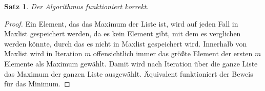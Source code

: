 \documentclass{article}
\newtheorem*{theorem*}{Satz}
\theoremstyle{remark}
\begin{document}
    \begin{theorem*}
        Der Algorithmus funktioniert korrekt.
    \end{theorem*}
    \begin{proof}
        Ein Element, das das Maximum der Liste ist, wird auf jeden Fall in Maxlist gespeichert werden, da es kein Element gibt, mit dem es verglichen werden könnte, durch das es nicht in Maxlist gespeichert wird. Innerhalb von Maxlist wird in Iteration $m$ offensichtlich immer das größte Element der ersten $m$ Elemente als Maximum gewählt. Damit wird nach Iteration über die ganze Liste das Maximum der ganzen Liste ausgewählt. Äquivalent funktioniert der Beweis für das Minimum.
    \end{proof}
\end{document}
